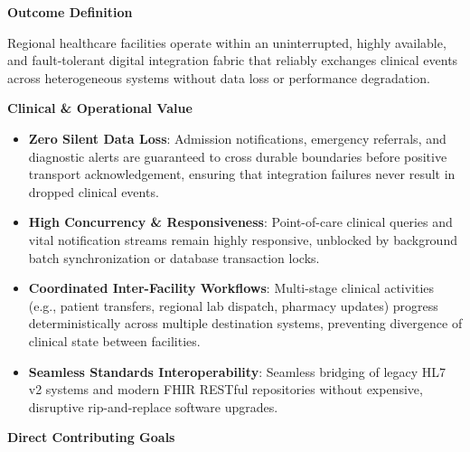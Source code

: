 \par\medskip\textbf{Outcome Definition}\par


Regional healthcare facilities operate within an uninterrupted, highly available, and fault-tolerant digital integration fabric that reliably exchanges clinical events across heterogeneous systems without data loss or performance degradation.



\par\medskip\textbf{Clinical \& Operational Value}\par


\begin{itemize}


\item \textbf{Zero Silent Data Loss}: Admission notifications, emergency referrals, and diagnostic alerts are guaranteed to cross durable boundaries before positive transport acknowledgement, ensuring that integration failures never result in dropped clinical events.

\item \textbf{High Concurrency \& Responsiveness}: Point-of-care clinical queries and vital notification streams remain highly responsive, unblocked by background batch synchronization or database transaction locks.

\item \textbf{Coordinated Inter-Facility Workflows}: Multi-stage clinical activities (e.g., patient transfers, regional lab dispatch, pharmacy updates) progress deterministically across multiple destination systems, preventing divergence of clinical state between facilities.

\item \textbf{Seamless Standards Interoperability}: Seamless bridging of legacy HL7 v2 systems and modern FHIR RESTful repositories without expensive, disruptive rip-and-replace software upgrades.

\end{itemize}


\par\medskip\textbf{Direct Contributing Goals}\par


